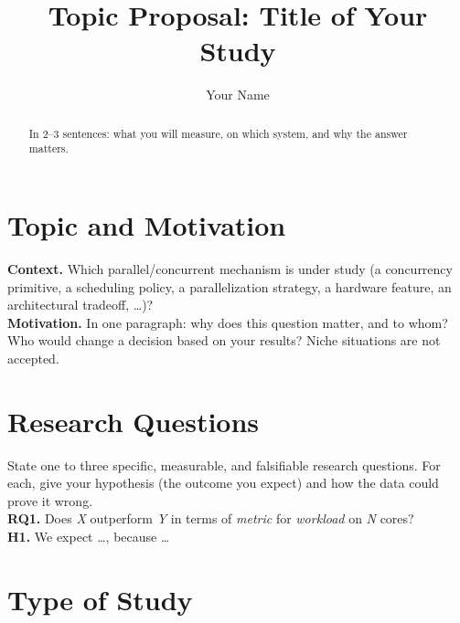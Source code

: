 \documentclass[sigplan]{acmart}
\begin{document}
\title{Topic Proposal: Title of Your Study}

\author{Your Name}


\begin{abstract}
In 2--3 sentences: what you will measure, on which system, and why the answer matters.
\end{abstract}

\pagestyle{plain} %

\maketitle

\section{Topic and Motivation}

\noindent\textbf{Context.} Which parallel/concurrent mechanism is under study (a concurrency primitive, a scheduling policy, a parallelization strategy, a hardware feature, an architectural tradeoff, \ldots)? \\

\noindent\textbf{Motivation.} In one paragraph: why does this question matter, and to whom? Who would change a decision based on your results? Niche situations are not accepted.

\section{Research Questions}

State one to three specific, measurable, and falsifiable research questions. For each, give your hypothesis (the outcome you expect) and how the data could prove it wrong. \\

\noindent\textbf{RQ1.} Does \textit{X} outperform \textit{Y} in terms of \textit{metric} for \textit{workload} on \textit{N} cores? \\
\noindent\textbf{H1.} We expect \ldots, because \ldots

\section{Type of Study}
\end{document}
